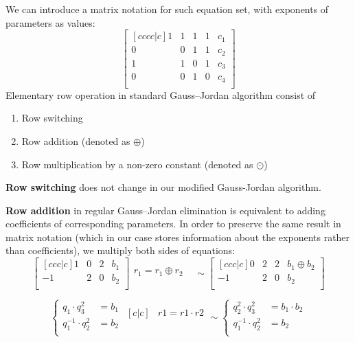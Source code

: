 We can introduce a matrix notation for such equation set, with exponents of parameters as values:
\begin{equation}
\begin{bmatrix}[cccc|c]
    1 & 1 & 1 & 1 & c_1\\
    0 & 0 & 1 & 1 & c_2\\
    1 & 1 & 0 & 1 & c_3\\
    0 & 0 & 1 & 0 & c_4\\
\end{bmatrix}
\end{equation}
Elementary row operation in standard Gauss--Jordan algorithm consist of 
\begin{enumerate}
    \item Row switching
    \item Row addition (denoted as $\oplus$)
    \item Row multiplication by a non-zero constant (denoted as $\odot$)
\end{enumerate}
\textbf{Row switching} does not change in our modified Gauss-Jordan algorithm.

\textbf{Row addition} in regular Gauss--Jordan elimination is equivalent to adding coefficients of corresponding parameters.
In order to preserve the same result in matrix notation (which in our case stores information about the exponents rather than coefficients), we multiply both sides of equations:
\begin{equation}
    \begin{bmatrix}[ccc|c]
        1 & 0 & 2 & b_1 \\
        -1 & 2 & 0 & b_2 \\
    \end{bmatrix}
    \begin{matrix}
        r_1 = r_1 \oplus r_2 \\
        &
    \end{matrix}
    \sim
    \begin{bmatrix}[ccc|c]
        0 & 2 & 2 & b_1 \oplus b_2 \\
        -1 & 2 & 0 & b_2 \\
    \end{bmatrix}
\end{equation}

\begin{equation}
    \begin{cases}
        q_1 \cdot q_3^2 &= b_1 \\
        q_1^{-1} \cdot q_2^2 &= b_2 \\
    \end{cases}
    \begin{matrix}[c|c]
        & r1 = r1 \cdot r2 \\
        & \\
    \end{matrix} \sim
    \begin{cases}
        q_2^2 \cdot q_3^{2} &= b_1 \cdot b_2 \\
        q_1^{-1} \cdot q_2^2 &= b_2 \\
    \end{cases}
\end{equation}


